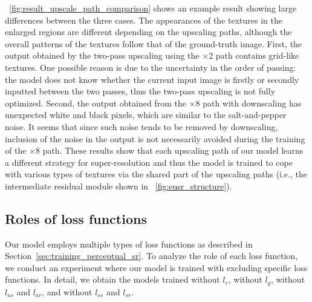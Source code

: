 \documentclass[runningheads]{llncs}
\begin{document}
\figurename~\ref{fig:result_upscale_path_comparison} shows an example result showing large differences between the three cases.
The appearances of the textures in the enlarged regions are different depending on the upscaling paths, although the overall patterns of the textures follow that of the ground-truth image.
First, the output obtained by the two-pass upscaling using the $\times$2 path contains grid-like textures.
One possible reason is due to the uncertainty in the order of passing: the model does not know whether the current input image is firstly or secondly inputted between the two passes, thus the two-pass upscaling is not fully optimized.
Second, the output obtained from the $\times$8 path with downscaling has unexpected white and black pixels, which are similar to the salt-and-pepper noise.
It seems that since such noise tends to be removed by downscaling, inclusion of the noise in the output is not necessarily avoided during the training of the $\times$8 path.
These results show that each upscaling path of our model learns a different strategy for super-resolution and thus the model is trained to cope with various types of textures via the shared part of the upscaling paths (i.e., the intermediate residual module shown in \figurename~\ref{fig:eusr_structure}).

\subsection{Roles of loss functions}

Our model employs multiple types of loss functions as described in Section~\ref{sec:training_perceptual_sr}.
To analyze the role of each loss function, we conduct an experiment where our model is trained with excluding specific loss functions.
In detail, we obtain the models trained without ${l}_{r}$, without ${l}_{g}$, without ${l}_{as}$ and ${l}_{ar}$, and without ${l}_{ss}$ and ${l}_{sr}$.
\end{document}

